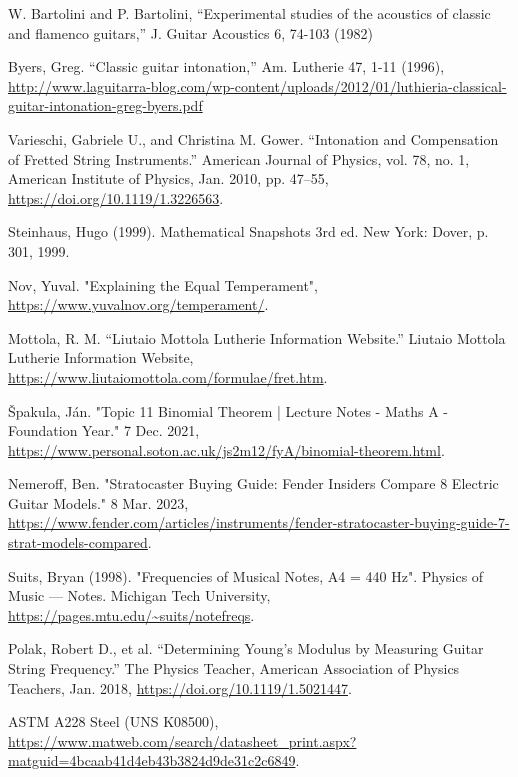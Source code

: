 \begin{thebibliography}{15}
    \scriptsize
     W. Bartolini and P. Bartolini, “Experimental studies of the acoustics of classic and flamenco guitars,” J. Guitar Acoustics 6, 74-103 (1982)

     Byers, Greg. “Classic guitar intonation,” Am. Lutherie 47, 1-11 (1996), \url{http://www.laguitarra-blog.com/wp-content/uploads/2012/01/luthieria-classical-guitar-intonation-greg-byers.pdf}
    
     Varieschi, Gabriele U., and Christina M. Gower. “Intonation and Compensation of Fretted String Instruments.” American Journal of Physics, vol. 78, no. 1, American Institute of Physics, Jan. 2010, pp. 47–55, \url{https://doi.org/10.1119/1.3226563}.

     Steinhaus, Hugo (1999). Mathematical Snapshots 3rd ed. New York: Dover, p. 301, 1999.
    
     Nov, Yuval. "Explaining the Equal Temperament", \url{https://www.yuvalnov.org/temperament/}.

     Mottola, R. M. “Liutaio Mottola Lutherie Information Website.” Liutaio Mottola Lutherie Information Website, \url{https://www.liutaiomottola.com/formulae/fret.htm}.

     Špakula, Ján. "Topic 11 Binomial Theorem | Lecture Notes - Maths A - Foundation Year." 7 Dec. 2021, \url{https://www.personal.soton.ac.uk/js2m12/fyA/binomial-theorem.html}.

     Nemeroff, Ben. "Stratocaster Buying Guide: Fender Insiders Compare 8 Electric Guitar Models." 8 Mar. 2023, \url{https://www.fender.com/articles/instruments/fender-stratocaster-buying-guide-7-strat-models-compared}.

     Suits, Bryan (1998). "Frequencies of Musical Notes, A4 = 440 Hz". Physics of Music — Notes. Michigan Tech University, \url{https://pages.mtu.edu/~suits/notefreqs}.
    
     Polak, Robert D., et al. “Determining Young’s Modulus by Measuring Guitar String Frequency.” The Physics Teacher, American Association of Physics Teachers, Jan. 2018, \url{https://doi.org/10.1119/1.5021447}.

     ASTM A228 Steel (UNS K08500), \url{https://www.matweb.com/search/datasheet_print.aspx?matguid=4bcaab41d4eb43b3824d9de31c2c6849}.


\end{thebibliography}
